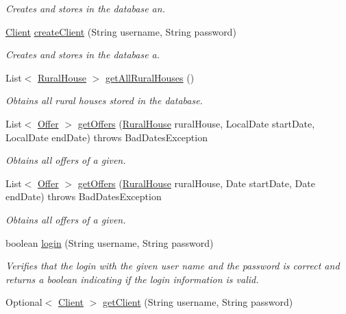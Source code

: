 \begin{DoxyCompactItemize}
\begin{DoxyCompactList}\small\item\em Creates and stores in the database an. \end{DoxyCompactList}\item 
\mbox{\hyperlink{a00164}{Client}} \mbox{\hyperlink{a00136_acb939a4c57b1136e2e8d1c7b661c10af}{create\+Client}} (String username, String password)
\begin{DoxyCompactList}\small\item\em Creates and stores in the database a. \end{DoxyCompactList}\item 
List$<$ \mbox{\hyperlink{a00188}{Rural\+House}} $>$ \mbox{\hyperlink{a00136_aba85657d1479d51b7bf1bd17d66d0513}{get\+All\+Rural\+Houses}} ()
\begin{DoxyCompactList}\small\item\em Obtains all rural houses stored in the database. \end{DoxyCompactList}\item 
List$<$ \mbox{\hyperlink{a00184}{Offer}} $>$ \mbox{\hyperlink{a00136_a31b31b351fd53d7eabe3346b043dc744}{get\+Offers}} (\mbox{\hyperlink{a00188}{Rural\+House}} rural\+House, Local\+Date start\+Date, Local\+Date end\+Date)  throws Bad\+Dates\+Exception
\begin{DoxyCompactList}\small\item\em Obtains all offers of a given. \end{DoxyCompactList}\item 
List$<$ \mbox{\hyperlink{a00184}{Offer}} $>$ \mbox{\hyperlink{a00136_a1ce3b82ceb8bda252ff3a54bab3e1c69}{get\+Offers}} (\mbox{\hyperlink{a00188}{Rural\+House}} rural\+House, Date start\+Date, Date end\+Date)  throws Bad\+Dates\+Exception
\begin{DoxyCompactList}\small\item\em Obtains all offers of a given. \end{DoxyCompactList}\item 
boolean \mbox{\hyperlink{a00136_a75cc2d20f7df7b8872333cca281bf343}{login}} (String username, String password)
\begin{DoxyCompactList}\small\item\em Verifies that the login with the given user name and the password is correct and returns a boolean indicating if the login information is valid. \end{DoxyCompactList}\item 
Optional$<$ \mbox{\hyperlink{a00164}{Client}} $>$ \mbox{\hyperlink{a00136_af9901ddc9cbe77aaa08085c3c19167c6}{get\+Client}} (String username, String password)

\end{DoxyCompactItemize}
